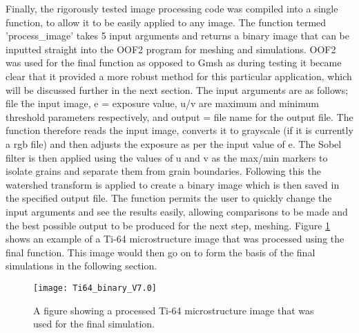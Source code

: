 \documentclass[\report.tex]{subfiles}
\begin{document}
\noindent Finally, the rigorously tested image processing code was compiled into a single function, to allow it to be easily applied to any image. The function termed 'process_image' takes 5 input arguments and returns a binary image that can be inputted straight into the OOF2 program for meshing and simulations. OOF2 was used for the final function as opposed to Gmsh as during testing it became clear that it provided a more robust method for this particular application, which will be discussed further in the next section. The input arguments are as follows; file \= the input image, e = exposure value, u/v are maximum and minimum threshold parameters respectively, and output = file name for the output file. The function therefore reads the input image, converts it to grayscale (if it is currently a rgb file) and then adjusts the exposure as per the input value of e. The Sobel filter is then applied using the values of u and v as the max/min markers to isolate grains and separate them from grain boundaries. Following this the watershed transform is applied to create a binary image which is then saved in the specified output file. The function permits the user to quickly change the input arguments and see the results easily, allowing comparisons to be made and the best possible output to be produced for the next step, meshing. Figure \ref{fig:FinalSim} shows an example of a Ti-64 microstructure image that was processed using the final function. This image would then go on to form the basis of the final simulations in the following section.

\begin{figure}[!htb]
  \centering
  \texttt{[image: Ti64\_binary\_V7.0]}
  \caption{A figure showing a processed Ti-64 microstructure image that was used for the final simulation.}
  \label{fig:FinalSim}
\end{figure}
\end{document}
